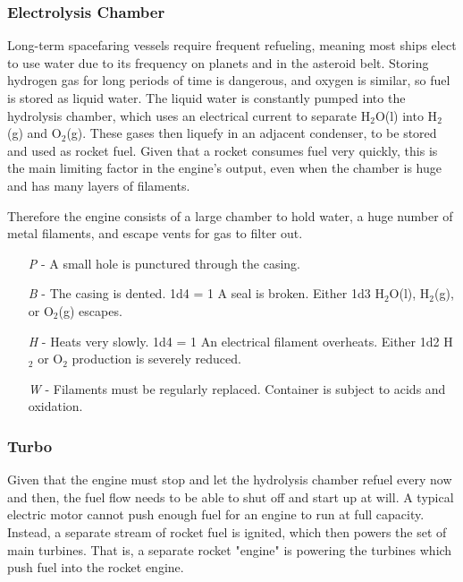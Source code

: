 \documentclass[a4paper]{article}
\begin{document}
\hspace{-18pt} \subsubsection{Electrolysis Chamber} \label{engine_electrolysis} \vspace{-0.2cm}
Long-term spacefaring vessels require frequent refueling, meaning most ships elect to use water due to its frequency on planets and in the asteroid belt. Storing hydrogen gas for long periods of time is dangerous, and oxygen is similar, so fuel is stored as liquid water. The liquid water is constantly pumped into the hydrolysis chamber, which uses an electrical current to separate H$_2$O(l) into H$_2$(g) and O$_2$(g). These gases then liquefy in an adjacent condenser, to be stored and used as rocket fuel. Given that a rocket consumes fuel very quickly, this is the main limiting factor in the engine's output, even when the chamber is huge and has many layers of filaments. 

Therefore the engine consists of a large chamber to hold water, a huge number of metal filaments, and escape vents for gas to filter out.

\begin{enumerate}
\item [\textit{P}] - A small hole is punctured through the casing. \newline 
\hspace*{3pt}  \\
\item [\textit{B}] - The casing is dented. \newline \hspace*{3pt} 1d4 = 1 A seal is broken. Either 1d3 H$_2$O(l), H$_2$(g), or O$_2$(g) escapes.
\item [\textit{H}] - Heats very slowly. \newline \hspace*{3pt} 1d4 = 1 An electrical filament overheats. Either 1d2 H$_2$ or O$_2$ production is severely reduced.
\item [\textit{W}] - Filaments must be regularly replaced. Container is subject to acids and oxidation.
\end{enumerate}

\vspace{-0.5cm} \hspace{-18pt} \subsubsection{Turbo} \label{engine_turbo} \vspace{-0.2cm}
Given that the engine must stop and let the hydrolysis chamber refuel every now and then, the fuel flow needs to be able to shut off and start up at will. A typical electric motor cannot push enough fuel for an engine to run at full capacity. Instead, a separate stream of rocket fuel is ignited, which then powers the set of main turbines. That is, a separate rocket "engine" is powering the turbines which push fuel into the rocket engine. 
\end{document}
